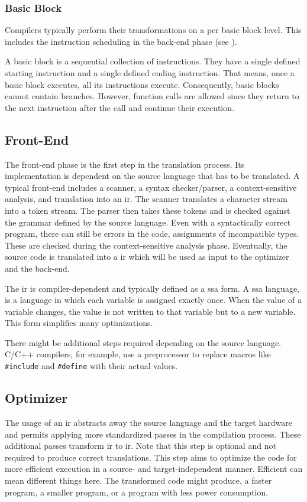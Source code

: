 \subsubsection{Basic Block}
Compilers typically perform their transformations on a per basic block level.
This includes the instruction scheduling in the back-end phase (see ).

A basic block is a sequential collection of instructions.
They have a single defined starting instruction and a single defined ending instruction.
That means, once a basic block executes, all its instructions execute.
Consequently, basic blocks cannot contain branches.
However, function calls are allowed since they return to the next instruction after the call and continue their execution.

\subsection{Front-End}
\label{sec:bg:compilers:frontend}
The front-end phase is the first step in the translation process.
Its implementation is dependent on the source language that has to be translated.
A typical front-end includes a scanner, a syntax checker/parser, a context-sensitive analysis, and translation into an \ac{ir}.
The scanner translates a character stream into a token stream.
The parser then takes these tokens and is checked against the grammar defined by the source language.
Even with a syntactically correct program, there can still be errors in the code, \eg assignments of incompatible types.
These are checked during the context-sensitive analysis phase.
Eventually, the source code is translated into a \ac{ir} which will be used as input to the optimizer and the back-end.

The \ac{ir} is compiler-dependent and typically defined as a \ac{ssa} form.
A \ac{ssa} language, is a language in which each variable is assigned exactly once.
When the value of a variable changes, the value is not written to that variable but to a new variable.
This form simplifies many optimizations.

There might be additional steps required depending on the source language.
C/C++ compilers, for example, use a preprocessor to replace macros like \lstinline{#include} and \lstinline{#define} with their actual values.

\subsection{Optimizer}
\label{sec:bg:compilers:optimizer}
The usage of an \ac{ir} abstracts away the source language and the target hardware and permits applying more standardized passes in the compilation process.
These additional passes transform \ac{ir} to \ac{ir}.
Note that this step is optional and not required to produce correct translations.
This step aims to optimize the code for more efficient execution in a source- and target-independent manner.
Efficient can mean different things here.
The transformed code might produce, \eg a faster program, a smaller program, or a program with less power consumption.

